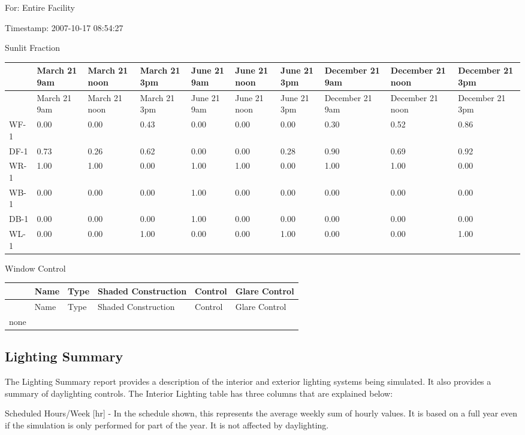 For: Entire Facility

Timestamp: 2007-10-17 08:54:27

Sunlit Fraction

{\scriptsize
\begin{longtable}[c]{p{0.6in}p{0.6in}p{0.6in}p{0.6in}p{0.6in}p{0.6in}p{0.6in}p{0.6in}p{0.6in}p{0.6in}}
\toprule
~ & March 21 9am & March 21 noon & March 21 3pm & June 21 9am & June 21 noon & June 21 3pm & December 21 9am & December 21 noon & December 21 3pm \tabularnewline
\midrule
\endfirsthead

\toprule
~ & March 21 9am & March 21 noon & March 21 3pm & June 21 9am & June 21 noon & June 21 3pm & December 21 9am & December 21 noon & December 21 3pm \tabularnewline
\midrule
\endhead

WF-1 & 0.00 & 0.00 & 0.43 & 0.00 & 0.00 & 0.00 & 0.30 & 0.52 & 0.86 \tabularnewline
DF-1 & 0.73 & 0.26 & 0.62 & 0.00 & 0.00 & 0.28 & 0.90 & 0.69 & 0.92 \tabularnewline
WR-1 & 1.00 & 1.00 & 0.00 & 1.00 & 1.00 & 0.00 & 1.00 & 1.00 & 0.00 \tabularnewline
WB-1 & 0.00 & 0.00 & 0.00 & 1.00 & 0.00 & 0.00 & 0.00 & 0.00 & 0.00 \tabularnewline
DB-1 & 0.00 & 0.00 & 0.00 & 1.00 & 0.00 & 0.00 & 0.00 & 0.00 & 0.00 \tabularnewline
WL-1 & 0.00 & 0.00 & 1.00 & 0.00 & 0.00 & 1.00 & 0.00 & 0.00 & 1.00 \tabularnewline
\bottomrule
\end{longtable}}

Window Control

\begin{longtable}[c]{@{}llllll@{}}
\toprule
~ & Name & Type & Shaded Construction & Control & Glare Control \tabularnewline
\midrule
\endfirsthead

\toprule
~ & Name & Type & Shaded Construction & Control & Glare Control \tabularnewline
\midrule
\endhead

none & ~ & ~ & ~ & ~ & ~ \tabularnewline
\bottomrule
\end{longtable}

\subsection{Lighting Summary}\label{lighting-summary}

The Lighting Summary report provides a description of the interior and exterior lighting systems being simulated. It also provides a summary of daylighting controls. The Interior Lighting table has three columns that are explained below:

Scheduled Hours/Week {[}hr{]} - In the schedule shown, this represents the average weekly sum of hourly values. It is based on a full year even if the simulation is only performed for part of the year. It is not affected by daylighting.

